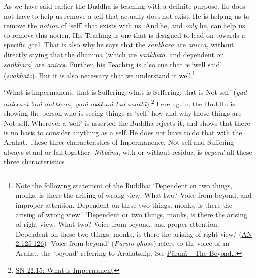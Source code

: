 As we have said earlier the Buddha is teaching with a definite purpose. He does not have to help us remove a self that actually does not exist. He is helping us to remove the \emph{notion} of `self' that exists with us. And he, and \emph{only} he, can help us to remove this notion. His Teaching is one that is designed to lead on towards a specific goal. That is also why he says that the \textit{saṅkhārā} are \textit{aniccā}, without directly saying that the dhamma (which are \textit{saṅkhatā}. and dependent on \textit{saṅkhārā}) are \textit{aniccā}. Further, his Teaching is also one that is `well said' (\textit{svākhāto}). But it is also necessary that we understand it well.\footnote{Note the following statement of the Buddha: `Dependent on two things, monks, is there the arising of wrong view. What two? Voice from beyond, and improper attention. Dependent on these two things, monks, is there the arising of wrong view.' `Dependent on two things, monks, is there the arising of right view. What two? Voice from beyond, and proper attention. Dependent on these two things, monks, is there the arising of right view.' (\href{https://suttacentral.net/an2.118-129/en/sujato}{AN 2.125-126}) `Voice from beyond' (\textit{Parato ghoso}) refers to the voice of an Arahat, the `beyond' referring to Arahatship. See \protect\hyperlink{beyond}{Pāraṁ -- The Beyond\ldots\hspace{0pt}}}

`What is impermanent, that is Suffering; what is Suffering, that is Not-self' (\textit{yad aniccaṁ taṁ dukkhaṁ, yaṁ dukkaṁ tad anattā}).\footnote{\href{https://suttacentral.net/sn22.15/en/bodhi}{SN 22.15: What is Impermanent}} Here again, the Buddha is showing the person who is seeing things as `self' how and why those things are Not-self. Wherever a `self' is asserted the Buddha rejects it, and shows that there is no basis to consider anything as a self. He does not have to do that with the Arahat. These three characteristics of Impermanence, Not-self and Suffering always stand or fall together. \textit{Nibbāna}, with or without residue, is \emph{beyond} all these three characteristics.

